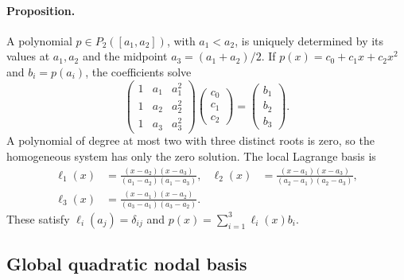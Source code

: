 \documentclass[11pt,a4paper]{article}
\begin{document}
\paragraph{Proposition.}
A polynomial \(p\in P_2([a_1,a_2])\), with \(a_1<a_2\), is uniquely
determined by its values at \(a_1,a_2\) and the midpoint
\(a_3=(a_1+a_2)/2\). If \(p(x)=c_0+c_1x+c_2x^2\) and \(b_i=p(a_i)\),
the coefficients solve
\[
 \begin{pmatrix}1&a_1&a_1^2\\1&a_2&a_2^2\\1&a_3&a_3^2\end{pmatrix}
 \begin{pmatrix}c_0\\c_1\\c_2\end{pmatrix}
 =\begin{pmatrix}b_1\\b_2\\b_3\end{pmatrix}.
\]
A polynomial of degree at most two with three distinct roots is zero,
so the homogeneous system has only the zero solution. The local
Lagrange basis is
\[
\begin{aligned}
 \ell_1(x)&=\frac{(x-a_2)(x-a_3)}{(a_1-a_2)(a_1-a_3)},&
 \ell_2(x)&=\frac{(x-a_1)(x-a_3)}{(a_2-a_1)(a_2-a_3)},\\
 \ell_3(x)&=\frac{(x-a_1)(x-a_2)}{(a_3-a_1)(a_3-a_2)}.&
\end{aligned}
\]
These satisfy \(\ell_i(a_j)=\delta_{ij}\) and
\(p(x)=\sum_{i=1}^{3}\ell_i(x)b_i\).

\begin{center}
\end{center}

\subsection{Global quadratic nodal basis}
\end{document}
